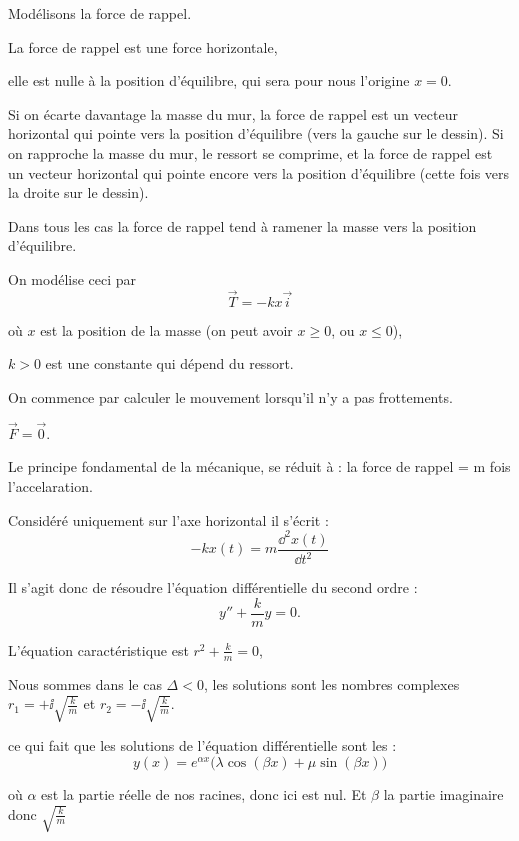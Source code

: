 \diapo

Modélisons la force de rappel.

\change
La force de rappel est une force horizontale, 

elle est nulle 
à la position d'équilibre, qui sera pour nous l'origine $x=0$.

\change
Si on écarte davantage la masse du mur, 
la force de rappel est un vecteur horizontal qui pointe 
vers la position d'équilibre (vers la gauche sur le dessin).
Si on rapproche la masse du mur, le ressort se comprime,
et la force de rappel est un vecteur horizontal qui pointe 
encore vers la position d'équilibre (cette fois vers la droite 
sur le dessin). 

Dans tous les cas la force de rappel tend à ramener 
la masse vers la position d'équilibre.


\change
On modélise ceci par 
$$\vec T = -k x \vec i$$

\change
où $x$ est la position de la masse 
(on peut avoir $x\ge0$, ou $x\le 0$), 

\change
$k>0$ est une constante qui dépend du ressort.

\diapo

On commence par calculer le mouvement lorsqu'il n'y a pas frottements.

\change
$\vec F = \vec 0$.

\change
Le principe fondamental de la mécanique, 
se réduit à : la force de rappel = m fois l'accelaration.

Considéré uniquement sur l'axe horizontal il s'écrit :
$$-kx(t) = m\frac{\dd^2 x(t)}{\dd t^2}$$

\change
Il s'agit donc de résoudre l'équation différentielle du second ordre :
$$y'' + \frac{k}{m} y = 0.$$

\change
L'équation caractéristique est $r^2+\frac{k}{m} = 0$,

\change
Nous sommes dans le cas $\Delta <0$, les solutions sont les nombres complexes 
$r_1 = +\ii\sqrt{\frac{k}{m}}$ et $r_2 = -\ii\sqrt{\frac{k}{m}}$.

\change
ce qui fait que les solutions de l'équation différentielle sont
les :
$$y(x) = e^{\alpha x}\big(\lambda\cos (\beta x)+\mu\sin (\beta x)\big)$$

où $\alpha$ est la partie réelle de nos racines, donc ici est nul.
Et $\beta$ la partie imaginaire donc $\sqrt{\frac{k}{m}}$

